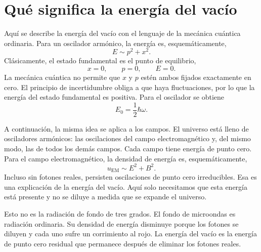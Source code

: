 \section{Qué significa la energía del vacío}

Aquí se describe la energía del vacío con el lenguaje de la mecánica cuántica ordinaria. Para un oscilador armónico, la energía es, esquemáticamente,
\begin{equation}
E\sim p^2+x^2.
\end{equation}
Clásicamente, el estado fundamental es el punto de equilibrio,
\begin{equation}
x=0,\qquad p=0,\qquad E=0.
\end{equation}
La mecánica cuántica no permite que \(x\) y \(p\) estén ambos fijados exactamente en cero. El principio de incertidumbre obliga a que haya fluctuaciones, por lo que la energía del estado fundamental es positiva. Para el oscilador se obtiene
\begin{equation}
E_0=\frac{1}{2}\hbar\omega.
\end{equation}

A continuación, la misma idea se aplica a los campos. El universo está lleno de osciladores armónicos: las oscilaciones del campo electromagnético y, del mismo modo, las de todos los demás campos. Cada campo tiene energía de punto cero. Para el campo electromagnético, la densidad de energía es, esquemáticamente,
\begin{equation}
u_{\mathrm{EM}}\sim E^2+B^2.
\end{equation}
Incluso sin fotones reales, persisten oscilaciones de punto cero irreducibles. Esa es una explicación de la energía del vacío. Aquí solo necesitamos que esta energía está presente y no se diluye a medida que se expande el universo.

\begin{classroomqa}
\end{classroomqa}

Esto no es la radiación de fondo de tres grados. El fondo de microondas es radiación ordinaria. Su densidad de energía disminuye porque los fotones se diluyen y cada uno sufre un corrimiento al rojo. La energía del vacío es la energía de punto cero residual que permanece después de eliminar los fotones reales.

